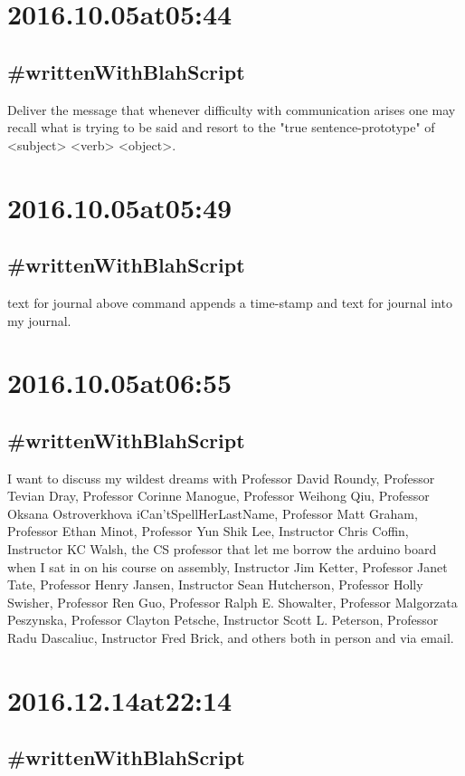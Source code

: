 \begin{enumerate}
\begin{enumerate}
\section*{ 2016.10.05at05:44 }
\subsection*{ #writtenWithBlahScript }
Deliver the message that whenever difficulty with communication arises one may recall what is trying to be said and resort to the "true sentence-prototype" of <subject> <verb> <object>.

\section*{ 2016.10.05at05:49 }
\subsection*{ #writtenWithBlahScript }
text for journal
\nThe above command appends a time-stamp and text for journal into my journal.

\section*{ 2016.10.05at06:55 }
\subsection*{ #writtenWithBlahScript }
I want to discuss my wildest dreams with Professor David Roundy, Professor Tevian Dray, Professor Corinne Manogue, Professor Weihong Qiu, Professor Oksana Ostroverkhova iCan'tSpellHerLastName, Professor Matt Graham, Professor Ethan Minot, Professor Yun Shik Lee, Instructor Chris Coffin, Instructor KC Walsh, the CS professor that let me borrow the arduino board when I sat in on his course on assembly, Instructor Jim Ketter, Professor Janet Tate, Professor Henry Jansen, Instructor Sean Hutcherson, Professor Holly Swisher, Professor Ren Guo, Professor Ralph E. Showalter, Professor Malgorzata Peszynska, Professor Clayton Petsche, Instructor Scott L. Peterson, Professor Radu Dascaliuc, Instructor Fred Brick, and others both in person and via email.

\section*{ 2016.12.14at22:14 }
\subsection*{ #writtenWithBlahScript }



\end{enumerate}
\end{enumerate}
